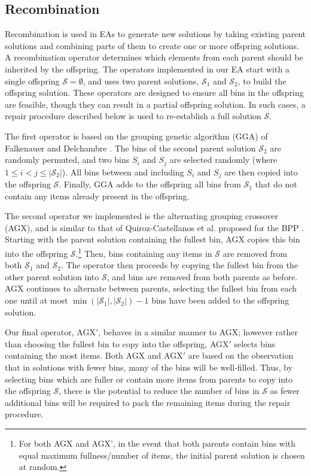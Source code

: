 \documentclass[a4paper,11pt,authoryear]{elsarticle}
\begin{document}
\subsection{Recombination}
\label{sub:recomb}
\noindent Recombination is used in EAs to generate new solutions by taking existing parent solutions and combining parts of them to create one or more offspring solutions. A recombination operator determines which elements from each parent should be inherited by the offspring. The operators implemented in our EA start with a single offspring $\mathcal{S} = \emptyset$, and uses two parent solutions, $\mathcal{S}_1$ and $\mathcal{S}_2$, to build the offspring solution. These operators are designed to ensure all bins in the offspring are feasible, though they can result in a partial offspring solution. In such cases, a repair procedure described below is used to re-establish a full solution $\mathcal{S}$.

The first operator is based on the grouping genetic algorithm (GGA) of Falkenauer and Delchambre \cite{falkenauer1992}. The bins of the second parent solution $\mathcal{S}_2$ are randomly permuted, and two bins $S_i$ and $S_j$ are selected randomly (where $1 \leq i < j \leq |\mathcal{S}_2|$). All bins between and including $S_i$ and $S_j$ are then copied into the offspring $\mathcal{S}$. Finally, GGA adds to the offspring all bins from $\mathcal{S}_1$ that do not contain any items already present in the offspring.

The second operator we implemented is the alternating grouping crossover (AGX), and is similar to that of Quiroz-Castellanos et al. proposed for the BPP \cite{quiroz2015}. Starting with the parent solution containing the fullest bin, AGX copies this bin into the offspring $\mathcal{S}$.\footnote{For both AGX and AGX', in the event that both parents contain bins with equal maximum fullness/number of items, the initial parent solution is chosen at random.} Then, bins containing any items in $\mathcal{S}$ are removed from both $\mathcal{S}_1$ and $\mathcal{S}_2$. The operator then proceeds by copying the fullest bin from the other parent solution into $\mathcal{S}$, and bins are removed from both parents as before. AGX continues to alternate between parents, selecting the fullest bin from each one until at most $\min (|\mathcal{S}_1|,|\mathcal{S}_2|) - 1$ bins have been added to the offspring solution.

Our final operator, AGX$'$, behaves in a similar manner to AGX; however rather than choosing the fullest bin to copy into the offspring, AGX$'$ selects bins containing the most items. Both AGX and AGX$'$ are based on the observation that in solutions with fewer bins, many of the bins will be well-filled. Thus, by selecting bins which are fuller or contain more items from parents to copy into the offspring $\mathcal{S}$, there is the potential to reduce the number of bins in $\mathcal{S}$ as fewer additional bins will be required to pack the remaining items during the repair procedure.
\end{document}
